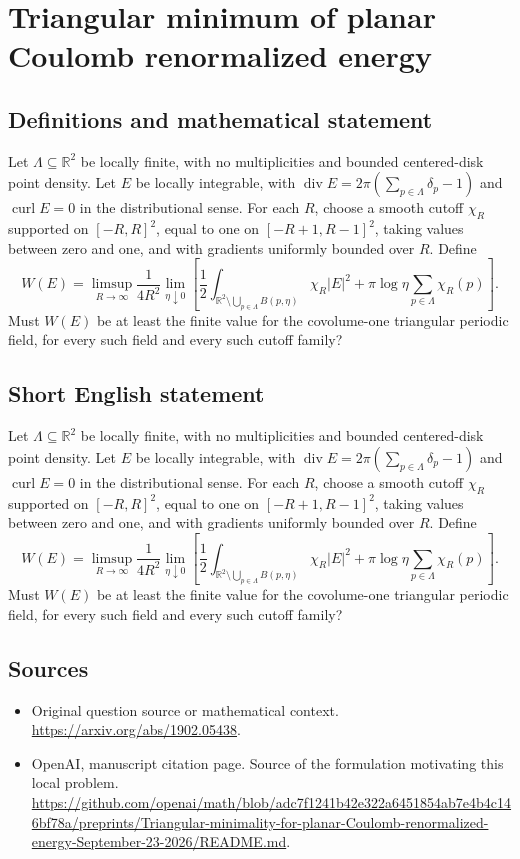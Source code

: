 \documentclass[11pt]{article}
\begin{document}
\section*{Triangular minimum of planar Coulomb renormalized energy}\label{statement}
\subsection{Definitions and mathematical statement}
Let $\Lambda\subseteq\mathbb R^2$ be locally finite, with no multiplicities and bounded centered-disk point density. Let $E$ be locally integrable, with $\operatorname{div}E=2\pi(\sum_{p\in\Lambda}\delta_p-1)$ and $\operatorname{curl}E=0$ in the distributional sense. For each $R$, choose a smooth cutoff $\chi_R$ supported on $[-R,R]^2$, equal to one on $[-R+1,R-1]^2$, taking values between zero and one, and with gradients uniformly bounded over $R$. Define
\[W(E)=\limsup_{R\to\infty}\frac{1}{4R^2}\lim_{\eta\downarrow0}\left[\frac12\int_{\mathbb R^2\setminus\bigcup_{p\in\Lambda}B(p,\eta)}\chi_R|E|^2+\pi\log\eta\sum_{p\in\Lambda}\chi_R(p)\right].\]
Must $W(E)$ be at least the finite value for the covolume-one triangular periodic field, for every such field and every such cutoff family?
\subsection{Short English statement}
Let $\Lambda\subseteq\mathbb R^2$ be locally finite, with no multiplicities and bounded centered-disk point density. Let $E$ be locally integrable, with $\operatorname{div}E=2\pi(\sum_{p\in\Lambda}\delta_p-1)$ and $\operatorname{curl}E=0$ in the distributional sense. For each $R$, choose a smooth cutoff $\chi_R$ supported on $[-R,R]^2$, equal to one on $[-R+1,R-1]^2$, taking values between zero and one, and with gradients uniformly bounded over $R$. Define
\[W(E)=\limsup_{R\to\infty}\frac{1}{4R^2}\lim_{\eta\downarrow0}\left[\frac12\int_{\mathbb R^2\setminus\bigcup_{p\in\Lambda}B(p,\eta)}\chi_R|E|^2+\pi\log\eta\sum_{p\in\Lambda}\chi_R(p)\right].\]
Must $W(E)$ be at least the finite value for the covolume-one triangular periodic field, for every such field and every such cutoff family?
\subsection{Sources}
\begin{itemize}
\item[S1] Original question source or mathematical context.
\url{https://arxiv.org/abs/1902.05438}.
\item[S2] OpenAI, manuscript citation page. Source of the formulation motivating this local problem.
\url{https://github.com/openai/math/blob/adc7f1241b42e322a6451854ab7e4b4c146bf78a/preprints/Triangular-minimality-for-planar-Coulomb-renormalized-energy-September-23-2026/README.md}.
\end{itemize}
\end{document}
